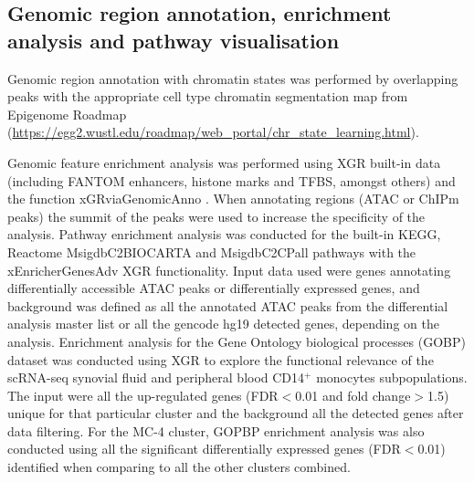



\subsection{Genomic region annotation, enrichment analysis and pathway visualisation}
Genomic region annotation with chromatin states was performed by overlapping peaks with the appropriate cell type chromatin segmentation map from Epigenome Roadmap (\url{https://egg2.wustl.edu/roadmap/web_portal/chr_state_learning.html}).

Genomic feature enrichment analysis was performed using XGR built-in data (including FANTOM enhancers, histone marks and TFBS, amongst others) and the function xGRviaGenomicAnno \parencite{Fang2016}. When annotating regions (ATAC or ChIPm peaks) the summit of the peaks were used to increase the specificity of the analysis. Pathway enrichment analysis was conducted for the built-in KEGG, Reactome MsigdbC2BIOCARTA and MsigdbC2CPall pathways with the xEnricherGenesAdv XGR functionality. Input data used were genes annotating differentially accessible ATAC peaks or differentially expressed genes, and background was defined as all the annotated ATAC peaks from the differential analysis master list or all the gencode hg19 detected genes, depending on the analysis. Enrichment analysis for the Gene Ontology  biological processes (GOBP) dataset was conducted using XGR to explore the functional relevance of the scRNA-seq synovial fluid and peripheral blood CD14$^+$ monocytes subpopulations. The input were all the up-regulated genes (FDR$<$0.01 and fold change$>$1.5) unique for that particular cluster and the background all the detected genes after data filtering. For the MC-4 cluster, GOPBP enrichment analysis was also conducted using all the significant differentially expressed genes (FDR$<$0.01) identified when comparing to all the other clusters combined.

